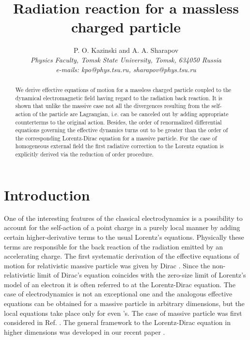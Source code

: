 \documentclass[a4paper,12pt]{article}
\title{\bf Radiation reaction for a massless charged particle}
\author {P. O. Kazinski
and A. A. Sharapov \protect\\
{ \it Physics Faculty, Tomsk State University, Tomsk, 634050  Russia }\\
{\it e-mails:  kpo@phys.tsu.ru,  sharapov@phys.tsu.ru }}
\begin{document}
\maketitle



\begin{abstract}

We derive effective equations of motion for a massless charged
particle coupled to the dynamical electromagnetic field having
regard to the radiation back reaction. It is shown that unlike the
massive case not all the divergences resulting from the
self-action of the particle are Lagrangian, i.e. can be canceled
out by adding appropriate counterterms to the original action.
Besides, the order of renormalized differential equations
governing the effective dynamics turns out to be greater than the
order of the corresponding Lorentz-Dirac equation for a massive
particle. For the case of homogeneous external field the first
radiative correction to the Lorentz equation is explicitly derived
via the reduction of order procedure.

\end{abstract}

\def\thesection{\arabic{section}}
\def\theequation{\arabic{equation}}






\section{Introduction}

One of the interesting features of the classical electrodynamics
is a possibility to account for the self-action of a point charge
in a purely local manner by adding certain higher-derivative terms
to the usual Lorentz's equations. Physically these terms are
responsible for the back reaction of the radiation emitted by an
accelerating charge. The first systematic derivation of the
effective equations of motion for \coordHE{} relativistic massive
particle was given by Dirac \cite{Dirac}. Since the
non-relativistic limit of Dirac's equation coincides with the
zero-size limit of Lorentz's model of an electron \cite{Lorentz}
it is often referred to at the Lorentz-Dirac equation. The case of
\coordHE{} electrodynamics is not an exceptional one and the analogous
effective equations can be obtained for a massive particle in
arbitrary dimensions, but the local equations take place only for
even \coordHE{}'s. The case of \coordHE{} massive particle was first
considered in Ref. \cite{Kos}. The general framework to the
Lorentz-Dirac equation in higher dimensions was developed in our
recent paper \cite{KLS}.
\end{document}

